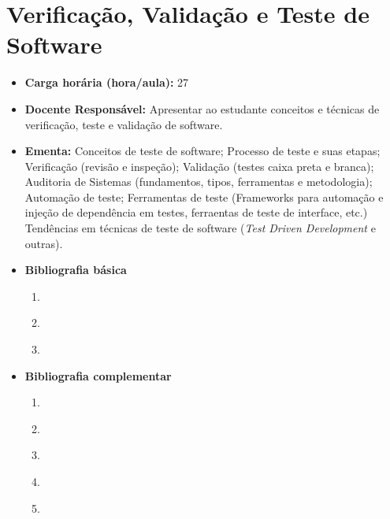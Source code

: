 \documentclass[11pt,fleqn]{book} %
\begin{document}
\section{Verificação, Validação e Teste de Software}\label{3_testsoft}
\begin{itemize}
	\item \textbf{Carga horária (hora/aula):} 27
	\item \textbf{Docente Responsável:} Apresentar ao estudante conceitos e técnicas de verificação, teste e validação de software.
	\item \textbf{Ementa:} 
	Conceitos de teste de software;
	Processo de teste e suas etapas;
	Verificação (revisão e inspeção);
	Validação (testes caixa preta e branca);
	Auditoria de Sistemas (fundamentos, tipos, ferramentas e metodologia);
	Automação de teste;
	Ferramentas de teste (Frameworks para automação e injeção de dependência em testes, ferraentas de teste de interface, etc.)
	Tendências em técnicas de teste de software (\textit{Test Driven Development} e outras).
	\item \textbf{Bibliografia básica}
	\begin{enumerate}
		\item \cite{pressman2016engenharia}
		\item \cite{cartilha2012}
		\item \cite{goncalves_2007}
	\end{enumerate}
	\item \textbf{Bibliografia complementar}
	\begin{enumerate}
		\item \cite{sommerville2011engenharia}
		\item \cite{de2003engenharia}
		\item \cite{deitel_deitel_2010}
		\item \cite{deitel_deitel_2006}
		\item \cite{minetto_2007}
	\end{enumerate} 	
\end{itemize}


\newpage
\end{document}
